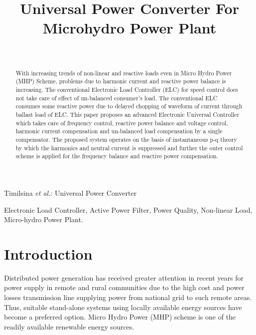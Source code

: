 \documentclass[journal,twoside]{IEEEtran}
\begin{document}
    \setcounter{page}{41}
    \title{Universal Power Converter For
Microhydro Power Plant}
    \author{\\
    }

%
{Timilsina \MakeLowercase{\textit{et al.}}: Universal Power Converter}
    \maketitle
	\begin{abstract}
With increasing trends of non-linear and reactive
loads even in Micro Hydro Power (MHP) Scheme, problems due
to harmonic current and reactive power balance is increasing.
The conventional Electronic Load Controller (ELC) for speed
control does not take care of effect of un-balanced consumer’s
load. The conventional ELC consumes some reactive power due
to delayed chopping of waveform of current through ballast load
of ELC. This paper proposes an advanced Electronic Universal
Controller which takes care of frequency control, reactive power
balance and voltage control, harmonic current compensation and
un-balanced load compensation by a single compensator. The
proposed system operates on the basis of instantaneous p-q
theory by which the harmonics and neutral current is suppressed
and further the outer control scheme is applied for the frequency
balance and reactive power compensation.
	\end{abstract}
	\begin{IEEEkeywords}
Electronic Load Controller, Active Power Filter,
Power Quality, Non-linear Load, Micro-hydro Power Plant.
	\end{IEEEkeywords}
	\section{Introduction}
Distributed power generation has received greater attention
in recent years for power supply in remote and rural
communities due to the high cost and power losses
transmission line supplying power from national grid to such
remote areas. Thus, suitable stand-alone systems using locally
available energy sources have become a preferred option.
Micro Hydro Power (MHP) scheme is one of the readily
available renewable energy sources.\cite{1}
\end{document}
